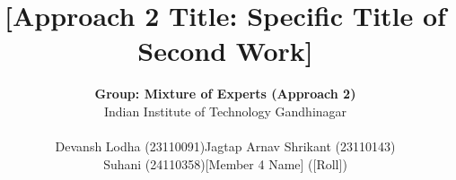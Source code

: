 \documentclass[11pt]{article}
\title{[Approach 2 Title: Specific Title of Second Work]}
\author{
  \textbf{Group: Mixture of Experts (Approach 2)} \\[0.5ex]
  Indian Institute of Technology Gandhinagar \\[1ex]
  \begin{tabular}{cc}
    Devansh Lodha (23110091) & Jagtap Arnav Shrikant (23110143) \\
    Suhani (24110358) & [Member 4 Name] ([Roll])
  \end{tabular}
}
\begin{document}
\maketitle









\nocite{*}

\end{document}
